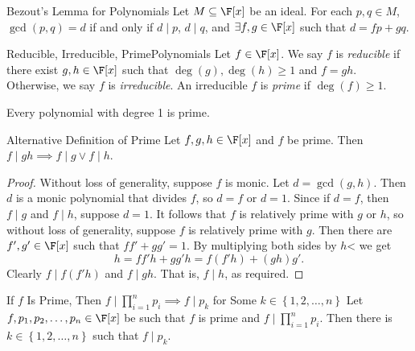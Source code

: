 \documentclass[math_245.tex]{subfiles}
\begin{document}
    \begin{theorem}{Bezout's Lemma for Polynomials}
        Let $M\subseteq \F[x]$ be an ideal. For each $p,q\in M$, $\gcd(p,q) = d$ if and only if $d\mid p$, $d\mid q$, and $\exists f,g\in \F[x]$ such that $d = fp+gq$.
    \end{theorem}

    \begin{definition}{Reducible, Irreducible, Prime}{Polynomials}
        Let $f\in \F[x]$. We say $f$ is \emph{reducible} if there exist $g,h\in \F[x]$ such that $\deg(g), \deg(h)\geq 1$ and $f=gh$. Otherwise, we say $f$ is \emph{irreducible}. An irreducible $f$ is \emph{prime} if $\deg(f)\geq 1$.
    \end{definition}

    \begin{remark}
        Every polynomial with degree 1 is prime.
    \end{remark}

    \begin{prop}{Alternative Definition of Prime}
        Let $f,g,h\in \F[x]$ and $f$ be prime. Then $f\mid gh \implies f\mid g \lor f\mid h$.
    \end{prop}

    \begin{proof}
        Without loss of generality, suppose $f$ is monic. Let $d=\gcd(g,h)$. Then $d$ is a monic polynomial that divides $f$, so $d=f$ or $d=1$. Since if $d=f$, then $f\mid g$ and $f\mid h$, suppose $d=1$. It follows that $f$ is relatively prime with $g$ or $h$, so without loss of generality, suppose $f$ is relatively prime with $g$. Then there are $f', g'\in \F[x]$ such that $ff'+gg'=1$. By multiplying both sides by $h$< we get
        \begin{equation*}
            h = ff'h + gg'h = f(f'h) + (gh)g'.
        \end{equation*}
        Clearly $f\mid f(f'h)$ and $f\mid gh$. That is, $f\mid h$, as required.
    \end{proof}

    \begin{cor}{If $f$ Is Prime, Then $f\mid \prod^n_{i=1} p_i \implies f\mid p_k$ for Some $k\in \left\lbrace 1, 2, \ldots, n \right\rbrace $}
        Let $f, p_1, p_2, \ldots, p_n\in \F[x]$ be such that $f$ is prime and $f\mid \prod^n_{i=1} p_i$. Then there is $k\in \left\lbrace 1, 2, \ldots, n \right\rbrace$ such that $f\mid p_k$.
    \end{cor}	
\end{document}
